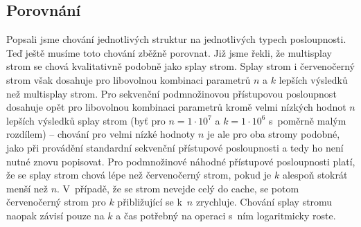 \subsection{Porovnání}

Popsali jsme chování jednotlivých struktur na jednotlivých typech posloupnosti.
Teď ještě musíme toto chování zběžně porovnat. Již jsme řekli, že multisplay
strom se chová kvalitativně podobně jako splay strom. Splay strom i
červenočerný strom však dosahuje pro libovolnou kombinaci parametrů $n$ a $k$
lepších výsledků než multisplay strom. Pro sekvenční podmnožinovou přístupovou
posloupnost dosahuje opět pro libovolnou kombinaci parametrů kromě velmi
nízkých hodnot $n$  lepších výsledků splay strom (byť pro $n=1\cdot 10^7$ a
$k=1\cdot 10^6$ s~poměrně malým rozdílem) -- chování pro velmi nízké hodnoty
$n$ je ale pro oba stromy podobné, jako při provádění standardní sekvenční
přístupové posloupnosti a tedy ho není nutné znovu popisovat. Pro podmnožinové
náhodné přístupové posloupnosti platí, že se splay strom chová lépe než
červenočerný strom, pokud je $k$ alespoň stokrát menší než $n$. V~případě, že
se strom nevejde celý do cache, se potom červenočerný strom pro $k$
přibližující se k~$n$ zrychluje. Chování splay stromu naopak závisí pouze na
$k$ a čas potřebný na operaci s~ním logaritmicky roste.

